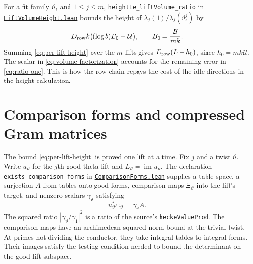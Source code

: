 \documentclass[11pt,oneside,openany]{amsbook}
\theoremstyle{remark}
\numberwithin{equation}{section}
\newcommand{\ghroot}{https://github.com/lsernau/grh-lean/blob/}
\newcommand{\ghrev}{72fead102f663d5c7a407964a13dc0cf9d977207}
\newcommand{\leanfile}[2]{%
  \href{\ghroot\ghrev/grh-compact/src/#1}{\nolinkurl{#2}}}
\begin{document}
For a fit family $\vartheta_\iota$ and $1\le j\le m$,
\texttt{heightLe\_liftVolume\_ratio} in
\leanfile{New/Rows/LiftVolumeHeight.lean}%
{LiftVolumeHeight.lean} bounds the height of
$\lambda_j(1)/\lambda_j(\vartheta_\iota^j)$ by
\begin{equation}
\label{eq:per-lift-height}
D_{\rm row}k\bigl((\log b)B_0-\mathcal U\bigr),
\qquad B_0=\frac{\mathcal B}{mk}.
\end{equation}
Summing \eqref{eq:per-lift-height} over the $m$ lifts gives
$D_{\rm row}(L-h_0)$, since $h_0=mk\mathcal U$.
The scalar in \eqref{eq:volume-factorization} accounts for
the remaining error in \eqref{eq:ratio-one}. This is how
the row chain repays the cost of the idle directions in the
height calculation.

\section{Comparison forms and compressed Gram matrices}
\label{sec:compressed-gram}
The bound \eqref{eq:per-lift-height} is proved one lift at
a time. Fix $j$ and a twist $\vartheta$. Write
$u_\vartheta$ for the $j$th good theta lift and
$L_\vartheta=\operatorname{im}u_\vartheta$.
The declaration \texttt{exists\_comparison\_forms} in
\leanfile{New/Rows/ComparisonForms.lean}%
{ComparisonForms.lean} supplies a table space, a
surjection $A$ from tables onto good forms, comparison
maps $\Xi_\vartheta$ into the lift's target, and nonzero
scalars $\gamma_\vartheta$ satisfying
\begin{equation}
\label{eq:comparison-adjoint}
u_\vartheta^*\Xi_\vartheta
 =\gamma_\vartheta A.
\end{equation}
The squared ratio
$|\gamma_\vartheta/\gamma_1|^2$ is a ratio of the
source's \texttt{heckeValueProd}. The comparison maps
have an archimedean squared-norm bound at the trivial
twist. At primes not dividing the conductor, they take
integral tables to integral forms. Their images satisfy
the testing condition needed to bound the determinant
on the good-lift subspace.
\end{document}
